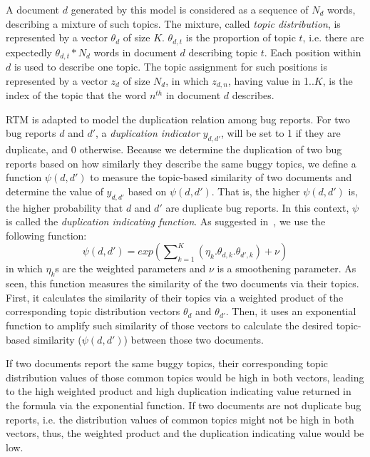 A document $d$ generated by this model is considered as a sequence of
$N_d$ words, describing a mixture of such topics. The mixture, called
{\em topic distribution}, is represented by a vector $\theta_d$ of
size $K$. $\theta_{d,t}$ is the proportion of topic $t$, i.e. there
are expectedly $\theta_{d,t}*N_d$ words in document $d$ describing
topic $t$. Each position within $d$ is used to describe one topic. The
topic assignment for such positions is represented by a vector $z_d$
of size $N_d$, in which $z_{d,n}$, having value in 1..$K$, is the
index of the topic that the word $n^{th}$ in document $d$ describes.

\vspace{0.04in}
RTM is adapted to model the duplication relation among bug
reports. For two bug reports $d$ and $d'$, a {\em duplication
indicator} $y_{d,d'}$, will be set to 1 if they are duplicate, and 0
otherwise. Because we determine the duplication of two bug reports
based on how similarly they describe the same buggy topics, we define
a function $\psi(d,d')$ to measure the topic-based similarity of two
documents and determine the value of $y_{d,d'}$ based on
$\psi(d,d')$. That is, the higher $\psi(d,d')$ is, the higher
probability that $d$ and $d'$ are duplicate bug reports. In this
context, $\psi$ is called the {\em duplication indicating
function}. As suggested in~\cite{RTM}, we use the following function:
$$\psi(d, d') = exp({\sum\nolimits_{k=1}^K(\eta_k.\theta_{d,k}.\theta_{d',k})+
\nu})$$ in which $\eta_k$s are the weighted parameters and $\nu$ is a
smoothening parameter. As seen, this function measures the similarity of
the two documents via their topics. First, it calculates the
similarity of their topics via a weighted product of the corresponding
topic distribution vectors $\theta_d$ and $\theta_{d'}$. Then, it uses
an exponential function to amplify such similarity of those
vectors to calculate the desired topic-based similarity ($\psi(d,d')$)
between those two documents.

If two documents report the same buggy topics, their corresponding
topic distribution values of those common topics would be high in both
vectors, leading to the high weighted product and high duplication
indicating value returned in the formula via the exponential function.
If two documents are not duplicate bug reports, i.e. the distribution
values of common topics might not be high in both vectors, thus, the
weighted product and the duplication indicating value would be low.


